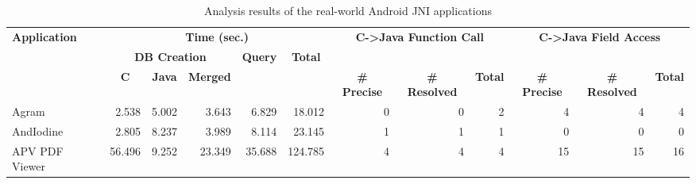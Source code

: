 \begin{table*}[t]
  \vspace{2mm}
  \caption{Analysis results of the real-world Android JNI applications}
  \label{table:RQ2}
  \vspace*{-1em}
  \centering
  \small
  \begin{tabular}{l||r|r|r|r|r||r|r|r||r|r|r}
    \multirow{3}{*}{\textbf{Application}} & \multicolumn{5}{c||}{\textbf{Time (sec.)}} & \multicolumn{3}{c||}{\multirow{2}{*}{\textbf{C->Java Function Call}}} & \multicolumn{3}{c}{\multirow{2}{*}{\textbf{C->Java Field Access}}} \\\hhline{~||-----||~~~||~~~}
    & \multicolumn{3}{c|}{\textbf{DB Creation}} & \multicolumn{1}{c|}{\multirow{2}{*}{\textbf{Query}}} & \multicolumn{1}{c||}{\multirow{2}{*}{\textbf{Total}}} & \multicolumn{3}{c||}{} & \multicolumn{3}{c}{} \\\hhline{~||---~|~||------}
    & \multicolumn{1}{c|}{\textbf{C}} & \multicolumn{1}{c|}{\textbf{Java}} & \multicolumn{1}{c|}{\textbf{Merged}} & \multicolumn{1}{c|}{} & \multicolumn{1}{c||}{} & \multicolumn{1}{c|}{\textbf{\# Precise}} & \multicolumn{1}{c|}{\textbf{\# Resolved}} & \multicolumn{1}{c||}{\textbf{Total}} & \multicolumn{1}{c|}{\textbf{\# Precise}} & \multicolumn{1}{c|}{\textbf{\# Resolved}} & \multicolumn{1}{l}{\textbf{Total}}  \\\hhline{=#*{4}{=|}=#=|=|=#=|=|=}
  Agram                  & 2.538                 & 5.002                    & 3.643                      & 6.829                                      & 18.012                                  & 0                           & 0                            & 2                         & 4                           & 4                            & 4                          \\
  AndIodine              & 2.805                 & 8.237                    & 3.989                      & 8.114                                      & 23.145                                  & 1                           & 1                            & 1                         & 0                           & 0                            & 0                          \\
  APV PDF Viewer         & 56.496                & 9.252                    & 23.349                     & 35.688                                     & 124.785                                 & 4                           & 4                            & 4                         & 15                          & 15                           & 16                         \\

\end{tabular}
\end{table*}
